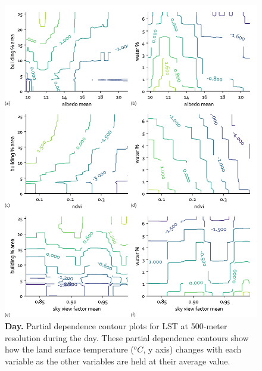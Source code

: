 \documentclass[final,3p,times,onecolumn,sort&compress]{elsarticle}
\begin{document}
\begin{figure}[h]
    \centering
    \includegraphics[width=\linewidth]{fig/report/pdp_2d_day_500.pdf}
    \caption[Partial dependence contour plots for LST at 500-meter resolution during the day]{
    \textbf{Day.} Partial dependence contour plots for LST at 500-meter resolution during the day.
    These partial dependence contours show how the land surface temperature ($^oC$, y axis) changes with each variable as the other variables are held at their average value. 
    }
    \label{fig:pdp_2dday_500}
\end{figure}


\clearpage
\end{document}
